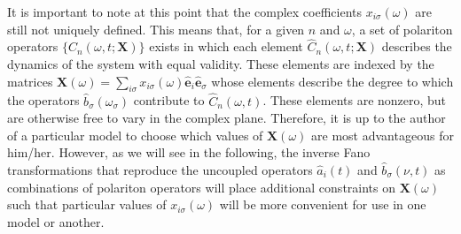 It is important to note at this point that the complex coefficients $x_{i\sigma}(\omega)$ are still not uniquely defined. This means that, for a given $n$ and $\omega$, a set of polariton operators $\{\hat{C}_n(\omega,t;\mathbf{X})\}$ exists in which each element $\hat{C}_n(\omega,t;\mathbf{X})$ describes the dynamics of the system with equal validity. These elements are indexed by the matrices $\mathbf{X}(\omega) = \sum_{i\sigma}x_{i\sigma}(\omega)\hat{\mathbf{e}}_i\hat{\mathbf{e}}_\sigma$ whose elements describe the degree to which the operators $\hat{b}_\sigma(\omega_\sigma)$ contribute to $\hat{C}_n(\omega,t)$. These elements are nonzero, but are otherwise free to vary in the complex plane. Therefore, it is up to the author of a particular model to choose which values of $\mathbf{X}(\omega)$ are most advantageous for him/her. However, as we will see in the following, the inverse Fano transformations that reproduce the uncoupled operators $\hat{a}_i(t)$ and $\hat{b}_\sigma(\nu,t)$ as combinations of polariton operators will place additional constraints on $\mathbf{X}(\omega)$ such that particular values of $x_{i\sigma}(\omega)$ will be more convenient for use in one model or another.


